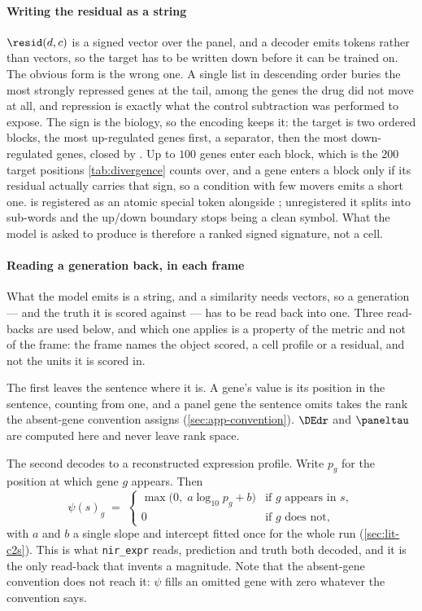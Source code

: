 \paragraph{Writing the residual as a string} $\resid(d,c)$ is a signed vector
over the panel, and a decoder emits tokens rather than vectors, so the target has
to be written down before it can be trained on. The obvious form is the wrong
one. A single list in descending order buries the most strongly repressed genes
at the tail, among the genes the drug did not move at all, and repression is
exactly what the control subtraction was performed to expose. The sign is the
biology, so the encoding keeps it: the target is two ordered blocks, the most
up-regulated genes first, a \DOWN{} separator, then the most down-regulated
genes, closed by \ENDCELL{}. Up to $100$ genes enter each block, which is the
$200$ target positions \cref{tab:divergence} counts over, and a gene enters a
block only if its residual actually carries that sign, so a condition with few
movers emits a short one. \DOWN{} is registered as an atomic special token
alongside \ENDCELL{}; unregistered it splits into sub-words and the up/down
boundary stops being a clean symbol. What the model is asked to produce is
therefore a ranked signed signature, not a cell.

\paragraph{Reading a generation back, in each frame} What the model emits is a
string, and a similarity needs vectors, so a generation --- and the truth it is
scored against --- has to be read back into one. Three read-backs are used below,
and which one applies is a property of the metric and not of the frame: the frame
names the object scored, a cell profile or a residual, and not the units it is
scored in.

The first leaves the sentence where it is. A gene's value is its position in the
sentence, counting from one, and a panel gene the sentence omits takes the rank
the absent-gene convention assigns (\cref{sec:app-convention}). $\DEdr$ and
$\paneltau$ are computed here and never leave rank space.

The second decodes to a reconstructed expression profile. Write $p_g$ for the
position at which gene $g$ appears. Then
\begin{equation}
 \psi(s)_g \;=\;
 \begin{cases}
   \max\!\big(0,\; a\log_{10} p_g + b\big) & \text{if $g$ appears in $s$},\\[2pt]
   0 & \text{if $g$ does not,}
 \end{cases}
\end{equation}
with $a$ and $b$ a single slope and intercept fitted once for the whole run
(\cref{sec:lit-c2s}). This is what \texttt{nir\_expr} reads, prediction and truth
both decoded, and it is the only read-back that invents a magnitude. Note that
the absent-gene convention does not reach it: $\psi$ fills an omitted gene with
zero whatever the convention says.

